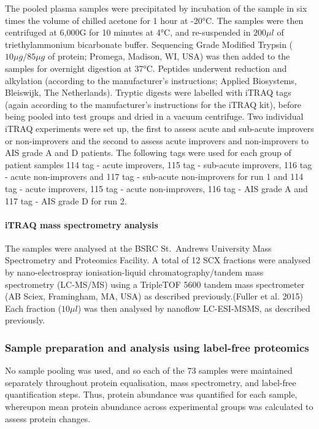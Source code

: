 \documentclass[9pt,lineno]{elife}
\begin{document}
The pooled plasma samples were precipitated by incubation of the sample in six times the volume of chilled acetone for 1 hour at -20°C.
The samples were then centrifuged at 6,000G for 10 minutes at 4°C, and re-suspended in \(200\mu l\) of triethylammonium bicarbonate buffer.
Sequencing Grade Modified Trypsin (\(10\mu g/85\mu g\) of protein; Promega, Madison, WI, USA) was then added to the samples for overnight digestion at 37°C.
Peptides underwent reduction and alkylation (according to the manufacturer's instructions; Applied Biosystems, Bleiswijk, The Netherlands).
Tryptic digests were labelled with iTRAQ tags (again according to the manufacturer's instructions for the iTRAQ kit), before being pooled into test groups and dried in a vacuum centrifuge.
Two individual iTRAQ experiments were set up, the first to assess acute and sub-acute improvers or non-improvers and the second to assess acute improvers and non-improvers to AIS grade A and D patients.
The following tags were used for each group of patient samples 114 tag - acute improvers, 115 tag - sub-acute improvers, 116 tag - acute non-improvers and 117 tag - sub-acute non-improvers for run 1 and 114 tag - acute improvers, 115 tag - acute non-improvers, 116 tag - AIS grade A and 117 tag - AIS grade D for run 2.

\hypertarget{itraq-mass-spectrometry-analysis}{%
\paragraph{iTRAQ mass spectrometry analysis}\label{itraq-mass-spectrometry-analysis}}

The samples were analysed at the BSRC St.~Andrews University Mass Spectrometry and Proteomics Facility.
A total of 12 SCX fractions were analysed by nano-electrospray ionisation-liquid chromatography/tandem mass spectrometry (LC-MS/MS) using a TripleTOF 5600 tandem mass spectrometer (AB Sciex, Framingham, MA, USA) as described previously.(Fuller et al. 2015)
Each fraction (\(10 \mu l\)) was then analysed by nanoflow LC-ESI-MSMS, as described previously.

\hypertarget{label-free-sample-prep}{%
\subsubsection{Sample preparation and analysis using label-free proteomics}\label{label-free-sample-prep}}

No sample pooling was used, and so each of the 73 samples were maintained separately throughout protein equalisation, mass spectrometry, and label-free quantification steps.
Thus, protein abundance was quantified for each sample, whereupon mean protein abundance across experimental groups was calculated to assess protein changes.
\end{document}
